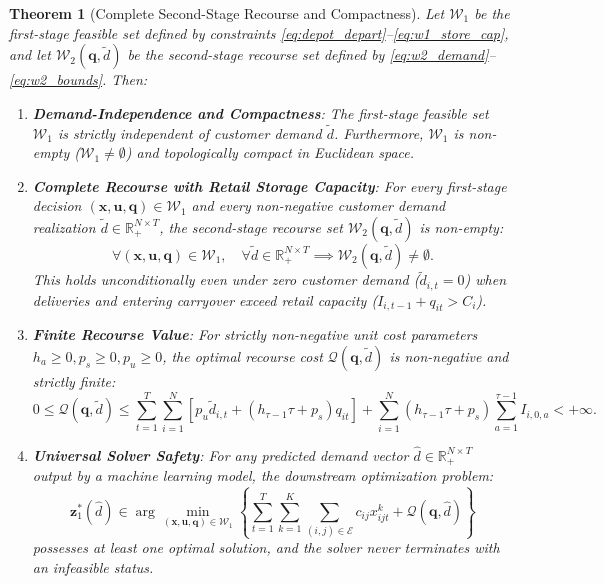 \documentclass[11pt,a4paper]{article}
\newtheorem{theorem}{Theorem}
\theoremstyle{definition}
\theoremstyle{remark}
\begin{document}
\begin{theorem}[Complete Second-Stage Recourse and Compactness]
\label{thm:recourse_feasibility}
Let $\mathcal{W}_1$ be the first-stage feasible set defined by constraints \eqref{eq:depot_depart}--\eqref{eq:w1_store_cap}, and let $\mathcal{W}_2(\mathbf{q}, \tilde{d})$ be the second-stage recourse set defined by \eqref{eq:w2_demand}--\eqref{eq:w2_bounds}. Then:
\begin{enumerate}[label=(\roman*)]
    \item \textbf{Demand-Independence and Compactness}: The first-stage feasible set $\mathcal{W}_1$ is strictly independent of customer demand $\tilde{d}$. Furthermore, $\mathcal{W}_1$ is non-empty ($\mathcal{W}_1 \neq \emptyset$) and topologically compact in Euclidean space.
    \item \textbf{Complete Recourse with Retail Storage Capacity}: For every first-stage decision $(\mathbf{x}, \mathbf{u}, \mathbf{q}) \in \mathcal{W}_1$ and every non-negative customer demand realization $\tilde{d} \in \mathbb{R}_+^{N \times T}$, the second-stage recourse set $\mathcal{W}_2(\mathbf{q}, \tilde{d})$ is non-empty:
    \begin{equation*}
        \forall (\mathbf{x}, \mathbf{u}, \mathbf{q}) \in \mathcal{W}_1, \quad \forall \tilde{d} \in \mathbb{R}_+^{N \times T} \implies \mathcal{W}_2(\mathbf{q}, \tilde{d}) \neq \emptyset.
    \end{equation*}
    This holds unconditionally even under zero customer demand ($\tilde{d}_{i,t} = 0$) when deliveries and entering carryover exceed retail capacity ($I_{i,t-1} + q_{it} > C_i$).
    \item \textbf{Finite Recourse Value}: For strictly non-negative unit cost parameters $h_a \ge 0, p_s \ge 0, p_u \ge 0$, the optimal recourse cost $\mathcal{Q}(\mathbf{q}, \tilde{d})$ is non-negative and strictly finite:
    \begin{equation*}
        0 \le \mathcal{Q}(\mathbf{q}, \tilde{d}) \le \sum_{t=1}^T \sum_{i=1}^N \left[ p_u \tilde{d}_{i,t} + (h_{\tau-1} \tau + p_s) q_{it} \right] + \sum_{i=1}^N (h_{\tau-1} \tau + p_s) \sum_{a=1}^{\tau-1} I_{i,0,a} < +\infty.
    \end{equation*}
    \item \textbf{Universal Solver Safety}: For any predicted demand vector $\hat{d} \in \mathbb{R}_+^{N \times T}$ output by a machine learning model, the downstream optimization problem:
    \begin{equation*}
        \mathbf{z}_1^*(\hat{d}) \in \arg\min_{(\mathbf{x}, \mathbf{u}, \mathbf{q}) \in \mathcal{W}_1} \left\{ \sum_{t=1}^T \sum_{k=1}^K \sum_{(i,j) \in \mathcal{E}} c_{ij} x_{ijt}^k + \mathcal{Q}(\mathbf{q}, \hat{d}) \right\}
    \end{equation*}
    possesses at least one optimal solution, and the solver never terminates with an infeasible status.
\end{enumerate}
\end{theorem}
\end{document}
